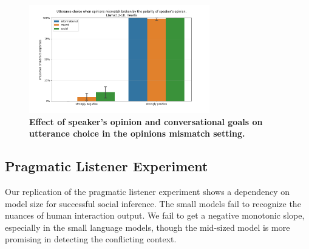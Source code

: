 \documentclass[11pt]{article}
\begin{document}
\begin{figure}[t]
    \centering
    \includegraphics[width=0.7\textwidth]{plots/speaker_experiment/llama3.2-1B_polarity.png}
    \caption{\textbf{Effect of speaker's opinion and conversational goals on utterance choice in the opinions mismatch setting.}}
    \label{fig:exp2-pol}
\end{figure}



\subsection{Pragmatic Listener Experiment}

Our replication of the pragmatic listener experiment shows a dependency on model size for successful social inference. The small models fail to recognize the nuances of human interaction output. We fail to get a negative monotonic slope, especially in the small language models, though the mid-sized model is more promising in detecting the conflicting context.
\end{document}
